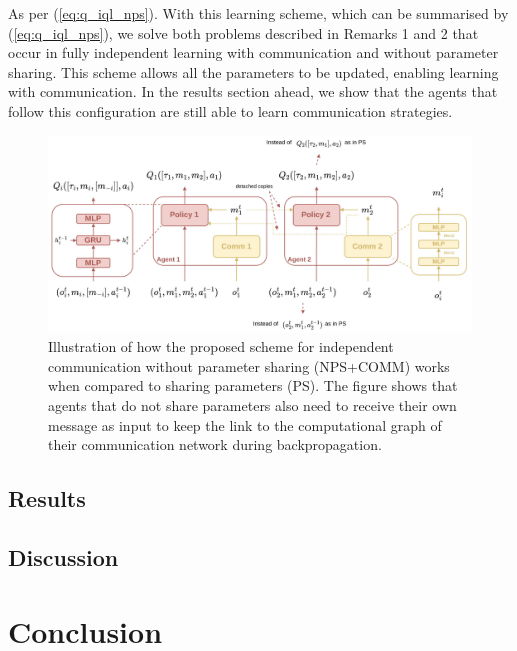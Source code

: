 \documentclass{article}
\begin{document}
As per (\ref{eq:q_iql_nps}). With this learning scheme, which can be summarised by (\ref{eq:q_iql_nps}), we solve both problems described in Remarks 1 and 2 that occur in fully independent learning with communication and without parameter sharing. This scheme allows all the parameters to be updated, enabling learning with communication. In the results section ahead, we show that the agents that follow this configuration are still able to learn communication strategies.

\begin{figure}
	\centering
	\includegraphics[scale=0.4]{images/nps_comm.png}
	\caption{Illustration of how the proposed scheme for independent communication without parameter sharing (NPS+COMM) \citep{pina2024fully} works when compared to sharing parameters (PS). The figure shows that agents that do not share parameters also need to receive their own message as input to keep the link to the computational graph of their communication network during backpropagation.}
	\label{fig:nps_comm}
\end{figure}


\subsection{Results}


\subsection{Discussion}


\newpage

\section{Conclusion}
\end{document}
